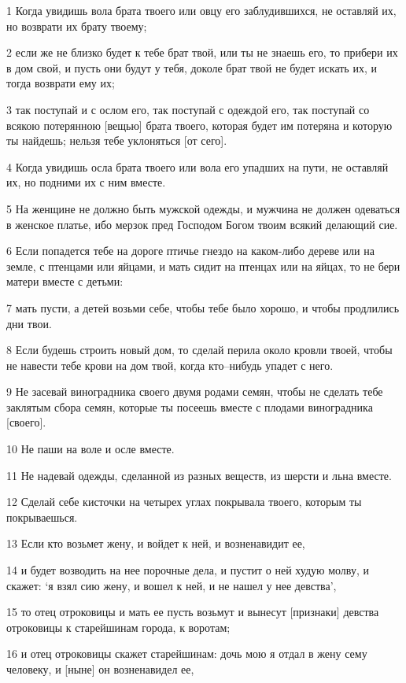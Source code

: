 \par 1 Когда увидишь вола брата твоего или овцу его заблудившихся, не оставляй их, но возврати их брату твоему;
\par 2 если же не близко будет к тебе брат твой, или ты не знаешь его, то прибери их в дом свой, и пусть они будут у тебя, доколе брат твой не будет искать их, и тогда возврати ему их;
\par 3 так поступай и с ослом его, так поступай с одеждой его, так поступай со всякою потерянною [вещью] брата твоего, которая будет им потеряна и которую ты найдешь; нельзя тебе уклоняться [от сего].
\par 4 Когда увидишь осла брата твоего или вола его упадших на пути, не оставляй их, но подними их с ним вместе.
\par 5 На женщине не должно быть мужской одежды, и мужчина не должен одеваться в женское платье, ибо мерзок пред Господом Богом твоим всякий делающий сие.
\par 6 Если попадется тебе на дороге птичье гнездо на каком-либо дереве или на земле, с птенцами или яйцами, и мать сидит на птенцах или на яйцах, то не бери матери вместе с детьми:
\par 7 мать пусти, а детей возьми себе, чтобы тебе было хорошо, и чтобы продлились дни твои.
\par 8 Если будешь строить новый дом, то сделай перила около кровли твоей, чтобы не навести тебе крови на дом твой, когда кто--нибудь упадет с него.
\par 9 Не засевай виноградника своего двумя родами семян, чтобы не сделать тебе заклятым сбора семян, которые ты посеешь вместе с плодами виноградника [своего].
\par 10 Не паши на воле и осле вместе.
\par 11 Не надевай одежды, сделанной из разных веществ, из шерсти и льна вместе.
\par 12 Сделай себе кисточки на четырех углах покрывала твоего, которым ты покрываешься.
\par 13 Если кто возьмет жену, и войдет к ней, и возненавидит ее,
\par 14 и будет возводить на нее порочные дела, и пустит о ней худую молву, и скажет: `я взял сию жену, и вошел к ней, и не нашел у нее девства',
\par 15 то отец отроковицы и мать ее пусть возьмут и вынесут [признаки] девства отроковицы к старейшинам города, к воротам;
\par 16 и отец отроковицы скажет старейшинам: дочь мою я отдал в жену сему человеку, и [ныне] он возненавидел ее,
